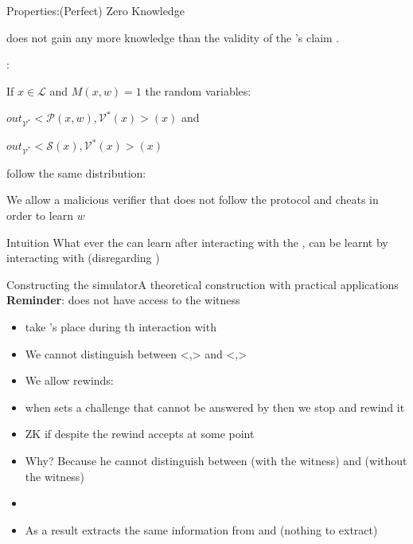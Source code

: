 \documentclass[handout]{beamer}
\begin{document}
\begin{frame}{Properties:(Perfect) Zero Knowledge}

 
\ver does not gain any more knowledge than the validity of the \prv's claim .
 
 : 

If  $x \in \mathcal{L}$ and $M(x,w) = 1$ the random variables:

$ out_{\mathcal{V}^*}<\mathcal{P}(x,w), \mathcal{V}^*(x)>(x) $ and  

$ out_{\mathcal{V}^*}<\mathcal{S}(x), \mathcal{V}^*(x)>(x) $ 

follow the same distribution:

We allow a \alert{malicious verifier} that does not follow the protocol and cheats in order to learn $w$
 
\begin{block}{Intuition}
What ever the \ver can learn after interacting with the \prv, can be learnt by interacting with \siml (disregarding \prv)

\end{block}
\end{frame}

\begin{frame}{Constructing the simulator}{A theoretical construction with practical applications}
\textbf{Reminder}: \siml does not have access to the witness
\pause
\begin{small}
\begin{itemize}
\setlength\itemsep{0.01em}
\item \siml take \prv's place during th interaction with \ver 
\pause
\item We cannot distinguish between <\siml,\ver> and <\prv,\ver>
\pause
\item We allow rewinds:
\pause
\item when \ver sets a challenge that cannot be answered by \siml then we stop and rewind it
\pause
\item ZK if despite the rewind \ver accepts at some point
\pause
\item Why? \pause
Because he cannot distinguish between \prv (with the witness) and \siml (without the witness) 
\pause
\item {}
\pause
\item As a result \ver extracts the same information from \prv and \siml (nothing to extract)

\end{itemize}
\end{small}
\end{frame}
\end{document}
